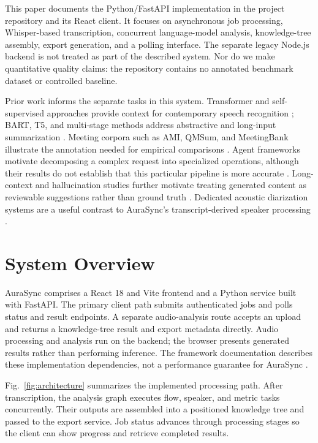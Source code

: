 \documentclass[conference]{IEEEtran}
\begin{document}
This paper documents the Python/FastAPI implementation in the project repository and its React client. It focuses on asynchronous job processing, Whisper-based transcription, concurrent language-model analysis, knowledge-tree assembly, export generation, and a polling interface. The separate legacy Node.js backend is not treated as part of the described system. Nor do we make quantitative quality claims: the repository contains no annotated benchmark dataset or controlled baseline.

Prior work informs the separate tasks in this system. Transformer and self-supervised approaches provide context for contemporary speech recognition \cite{attention,wav2vec,speechtransformer,whisper}; BART, T5, and multi-stage methods address abstractive and long-input summarization \cite{bart,t5,summn}. Meeting corpora such as AMI, QMSum, and MeetingBank illustrate the annotation needed for empirical comparisons \cite{ami,qmsum,meetingbank}. Agent frameworks motivate decomposing a complex request into specialized operations, although their results do not establish that this particular pipeline is more accurate \cite{agentsurvey,react,autogen}. Long-context and hallucination studies further motivate treating generated content as reviewable suggestions rather than ground truth \cite{longcontext,hallucinationsurvey,halueval}. Dedicated acoustic diarization systems are a useful contrast to AuraSync's transcript-derived speaker processing \cite{pyannote,fujita}.

\section{System Overview}
AuraSync comprises a React 18 and Vite frontend and a Python service built with FastAPI. The primary client path submits authenticated jobs and polls status and result endpoints. A separate audio-analysis route accepts an upload and returns a knowledge-tree result and export metadata directly. Audio processing and analysis run on the backend; the browser presents generated results rather than performing inference. The framework documentation describes these implementation dependencies, not a performance guarantee for AuraSync \cite{fastapi,reactdocs,langgraphdocs,plotlydocs}.

Fig.~\ref{fig:architecture} summarizes the implemented processing path. After transcription, the analysis graph executes flow, speaker, and metric tasks concurrently. Their outputs are assembled into a positioned knowledge tree and passed to the export service. Job status advances through processing stages so the client can show progress and retrieve completed results.
\end{document}

